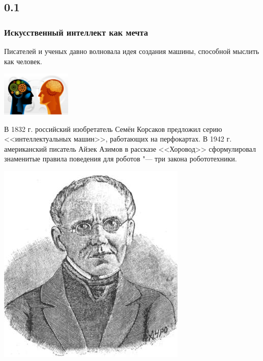 \documentclass[default]{beamer}
\begin{document}
	\subsection{0.1}
	\begin{frame}
		\frametitle{Искусственный интеллект как мечта}
		\footnotesize
		Писателей и ученых давно волновала идея создания машины, способной мыслить как человек.
		\begin{center}
			\includegraphics[width=0.25\textwidth]{ai_idea.jpg}
		\end{center}

		В 1832 г. российский изобретатель Семён Корсаков предложил серию <<интеллектуальных машин>>, работающих на перфокартах. В 1942 г. американский писатель Айзек Азимов в рассказе <<Хоровод>> сформулировал знаменитые правила поведения для роботов "--- три закона робототехники.
		\begin{center}
			\includegraphics[height=0.25\textheight]{korsakov.jpg}\quad

\end{center}
\end{frame}
\end{document}
